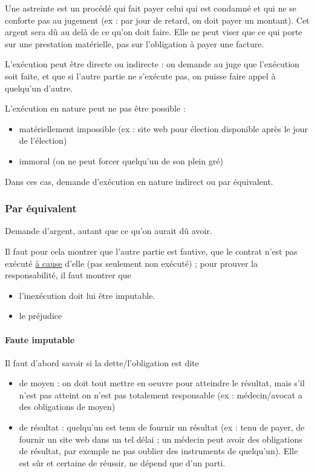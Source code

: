 			Une astreinte est un procédé qui fait payer celui qui est condamné et qui ne se conforte pas au jugement (ex : par jour de retard, on doit payer un montant). Cet argent sera dû au delà de ce qu'on doit faire. Elle ne peut viser que ce qui porte sur une prestation matérielle, pas sur l'obligation à payer une facture.
			
			L'exécution peut être directe ou indirecte : on demande au juge que l'exécution soit faite, et que si l'autre partie ne s'exécute pas, on puisse faire appel à quelqu'un d'autre.
			
			L'exécution en nature peut ne pas être possible :
			
			\begin{itemize}
				\item matériellement impossible (ex : site web pour élection disponible après le jour de l'élection)
				\item immoral (on ne peut forcer quelqu'un de son plein gré)
			\end{itemize}
		
			Dans ces cas, demande d'exécution en nature indirect ou par équivalent.
			
			\subsubsection{Par équivalent}
			
			Demande d'argent, autant que ce qu'on aurait dû avoir.
			
			Il faut pour cela montrer que l'autre partie est fautive, que le contrat n'est pas exécuté \underline{à cause} d'elle (pas seulement non exécuté) ; pour prouver la responsabilité, il faut montrer que
			
			 \begin{itemize}
				\item l'inexécution doit lui être imputable.
				\item le préjudice
			\end{itemize}
			
			
			\paragraph{Faute imputable}
			
			Il faut d'abord savoir si la dette/l'obligation est dite
			
			\begin{itemize}
				\item de moyen : on doit tout mettre en oeuvre pour atteindre le résultat, mais s'il n'est pas atteint on n'est pas totalement responsable (ex : médecin/avocat a des obligations de moyen)
				\item de résultat : quelqu'un est tenu de fournir un résultat (ex : tenu de payer, de fournir un site web dans un tel délai ; un médecin peut avoir des obligations de résultat, par exemple ne pas oublier des instruments de quelqu'un). Elle est sûr et certaine de réussir, ne dépend que d'un parti.
			\end{itemize}
			
